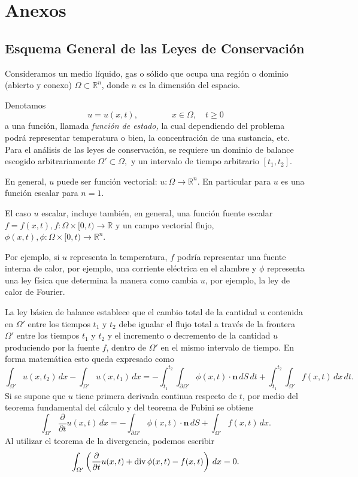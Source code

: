 \chapter{Anexos}\label{cap:anexos}

\section{Esquema General de las Leyes de Conservación}

Consideramos un medio líquido, gas o sólido que ocupa una región o dominio (abierto y conexo) $\Omega \subset \mathbb{R}^n$, donde $n$ es la dimensión del espacio.

Denotamos
\[
u = u(x,t), \qquad \qquad x \in \Omega, \quad t \geq 0
\]
a una función, llamada \textit{función de estado,} la cual dependiendo del problema podrá representar temperatura o bien, la concentración de una sustancia, etc. Para el análisis de las leyes de conservación, se requiere un dominio de balance escogido arbitrariamente $\Omega' \subset \Omega,$ y un intervalo de tiempo arbitrario $[t_1, t_2]$. 

En general, $u$ puede ser función vectorial: $u: \Omega \longrightarrow \mathbb{R}^n$. En particular para $u$ es una función escalar para $n=1$.

El caso $u$ escalar, incluye también, en general, una función fuente escalar $f=f(x,t), f:\Omega \times [0,t) \longrightarrow \mathbb{R}$ y un campo vectorial flujo, $\phi(x,t), \phi:\Omega \times [0,t) \longrightarrow \mathbb{R}^n$.

Por ejemplo, si $u$ representa la temperatura, $f$ podría representar una fuente interna de calor, por ejemplo, una corriente eléctrica en el alambre y $\phi$ representa una ley física que determina la manera como cambia $u$, por ejemplo, la ley de calor de Fourier.

La ley básica de balance establece que el cambio total de la cantidad $u$ contenida en $\Omega'$ entre los tiempos $t_1$ y $t_2$ debe igualar el flujo total a través de la frontera $\Omega'$ entre los tiempos $t_1$ y $t_2$ y el incremento o decremento de la cantidad $u$ produciendo por la fuente $f$, dentro de $\Omega'$ en el mismo intervalo de tiempo. En forma matemática esto queda expresado como
\[
\int_{\Omega'} u(x,t_2) \,dx - \int_{\Omega'} u(x,t_1) \,dx = - \int_{t_1}^{t_2} \int_{\partial \Omega'} \phi (x,t) \cdot \textbf{n} \,dS \,dt + \int_{t_1}^{t_2} \int_{\Omega'} f(x,t) \,dx \,dt.
\]
Si se supone que $u$ tiene primera derivada continua respecto de $t$, por medio del teorema fundamental del cálculo y del teorema de Fubini se obtiene
\[
\int_{\Omega'} \frac{\partial}{\partial t} u(x,t) \,dx = - \int_{\partial \Omega'} \phi(x,t) \cdot \textbf{n} \,dS + \int_{\Omega'} f(x,t) \,dx.
\]
Al utilizar el teorema de la divergencia, podemos escribir
\[
\int_{\Omega'} \left( \frac{\partial}{\partial t} u(x,t) + \text{div} \thinspace \phi(x, t)- f(x,t) \right) \,dx = 0.
\]

